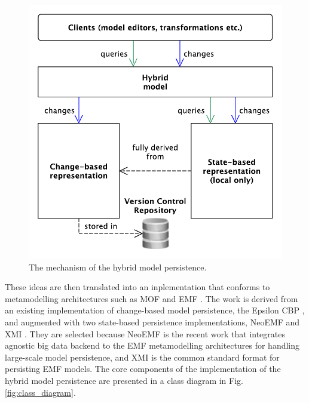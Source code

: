\documentclass[10pt,conference]{IEEEtran}
\begin{document}
\begin{figure}[ht]
    \includegraphics[width=\linewidth]{images/hybrid_persistence}
    \caption{The mechanism of the hybrid model persistence.}
    \label{fig:hybrid_persistence}
\end{figure}

These ideas are then translated into an inplementation that conforms to metamodelling architectures such as MOF \cite{omg2018mof} and EMF \cite{steinberg2008emf}. The work is derived from an existing implementation of change-based model persistence, the Epsilon CBP \cite{DBLP:conf/models/YohannisKP17}, and augmented with two state-based persistence implementations, NeoEMF \cite{daniel2016neoemf} and XMI \cite{omg2018xmi}. They are selected because NeoEMF is the recent work that integrates agnostic big data backend to the EMF metamodelling architectures for handling large-scale model persistence, and XMI is the common standard format for persisting EMF models. The core components of the implementation of the hybrid model persistence are presented in a class diagram in Fig. \ref{fig:class_diagram}. 
\end{document}
